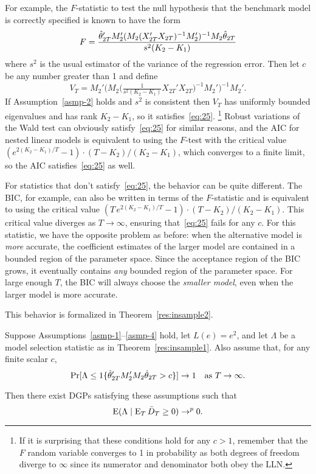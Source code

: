 \documentclass[12pt]{article}
\begin{document}
For example, the $F$-statistic to test the null hypothesis that the
benchmark model is correctly specified is known to have the form
\begin{equation*}
  F = \frac{\hat\theta_{2T}' M_2' ( M_2 (X_{2T}'X_{2T})^{-1} M_2' )^{-1} M_2
    \hat\theta_{2T}}{s^2 (K_2 - K_1)}
\end{equation*}
where $s^2$ is the usual estimator of the variance of the regression
error. Then let $c$ be any number greater than 1 and define
\begin{equation*}
  V_T = M_2' \big( M_2 \big(\tfrac{1}{s^2 (K_2 - K_1)} X_{2T}'X_{2T}\big)^{-1}
  M_2' \big)^{-1} M_2'.
\end{equation*}
If Assumption~\ref{asmp-2} holds and $s^2$ is consistent then $V_T$
has uniformly bounded eigenvalues and has rank $K_2 - K_1$, so it
satisfies~\eqref{eq:25}.%
\footnote{If it is surprising that these conditions hold for any $c >
  1$, remember that the $F$ random variable converges to 1 in
  probability as both degrees of freedom diverge to $\infty$ since its
  numerator and denominator both obey the LLN.} %
Robust variations of the Wald test can obviously satisfy~\eqref{eq:25}
for similar reasons, and the AIC for nested linear models is
equivalent to using the $F$-test with the critical value %
$(e^{2 (K_2 - K_1) / T} - 1) \cdot (T - K_2) / (K_2 - K_1)$, %
which converges to a finite limit, so the AIC satisfies~\eqref{eq:25}
as well.

For statistics that don't satisfy~\eqref{eq:25}, the behavior can be
quite different. The BIC, for example, can also be written in terms of
the $F$-statistic and is equivalent to using the critical value $(T \,
e^{2 (K_2 - K_1) / T} - 1) \cdot (T - K_2) / (K_2 - K_1)$. This
critical value diverges as $T \to \infty$, ensuring that~\eqref{eq:25}
fails for any $c$. For this statistic, we have the opposite problem as
before: when the alternative model is \emph{more} accurate, the
coefficient estimates of the larger model are contained in a bounded
region of the parameter space. Since the acceptance region of the BIC
grows, it eventually contains \emph{any} bounded region of the
parameter space. For large enough $T$, the BIC will always choose the
\emph{smaller model}, even when the larger model is more accurate.

This behavior is formalized in Theorem~\ref{res:insample2}.
\begin{thm}\label{res:insample2}
  Suppose Assumptions~\ref{asmp-1}--\ref{asmp-4} hold, let $L(e) =
  e^2$, and let $\Lambda$ be a model selection statistic as in
  Theorem~\ref{res:insample1}. Also assume that, for any finite scalar
  $c$,
  \begin{equation}\label{eq:27}
    \Pr[\Lambda \leq \operatorname{1}\{\hat\theta_{2T}'M_2' M_2\hat\theta_{2T} > c \}] \to 1
    \quad \text{as } T \to \infty.
  \end{equation}

  Then there exist DGPs satisfying these assumptions such that
  \begin{equation}\label{eq:15}
    \operatorname{E}( \Lambda \mid \operatorname{E}_T \bar{D}_{T} \geq 0 ) \to^p 0.
  \end{equation}
\end{thm}
\end{document}
